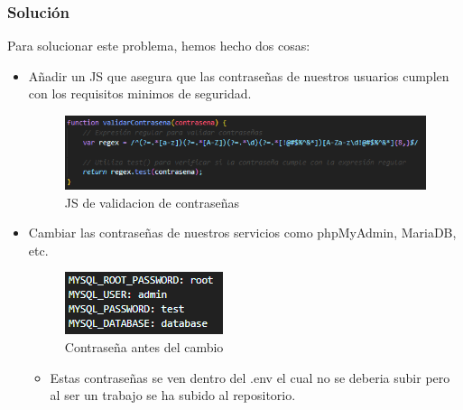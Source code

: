 \documentclass{report}
\begin{document}
                \subsubsection{Solución}
                    Para solucionar este problema, hemos hecho dos cosas:
                    \begin{itemize}
                        \item Añadir un JS que asegura que las contraseñas de nuestros usuarios cumplen con los requisitos minimos de seguridad.
                        \begin{figure}[H]
                            \centering
                            \includegraphics[width=\textwidth]{./img/vulnerabilidades/3.7/2.1.png}
                            \caption{JS de validacion de contraseñas}
                        \end{figure}
                        \item Cambiar las contraseñas de nuestros servicios como phpMyAdmin, MariaDB, etc.
                        \begin{figure}[H]
                            \centering
                            \includegraphics[width=\textwidth]{./img/vulnerabilidades/3.7/2.2.png}
                            \caption{Contraseña antes del cambio}                            
                        \end{figure}
                        \begin{itemize}
                            \item Estas contraseñas se ven dentro del .env el cual no se deberia subir pero al ser un trabajo se ha subido al repositorio.
                        \end{itemize}
                    \end{itemize}
            \clearpage
\end{document}
